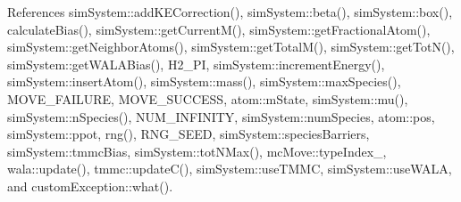 References sim\-System\-::add\-K\-E\-Correction(), sim\-System\-::beta(), sim\-System\-::box(), calculate\-Bias(), sim\-System\-::get\-Current\-M(), sim\-System\-::get\-Fractional\-Atom(), sim\-System\-::get\-Neighbor\-Atoms(), sim\-System\-::get\-Total\-M(), sim\-System\-::get\-Tot\-N(), sim\-System\-::get\-W\-A\-L\-A\-Bias(), H2\-\_\-P\-I, sim\-System\-::increment\-Energy(), sim\-System\-::insert\-Atom(), sim\-System\-::mass(), sim\-System\-::max\-Species(), M\-O\-V\-E\-\_\-\-F\-A\-I\-L\-U\-R\-E, M\-O\-V\-E\-\_\-\-S\-U\-C\-C\-E\-S\-S, atom\-::m\-State, sim\-System\-::mu(), sim\-System\-::n\-Species(), N\-U\-M\-\_\-\-I\-N\-F\-I\-N\-I\-T\-Y, sim\-System\-::num\-Species, atom\-::pos, sim\-System\-::ppot, rng(), R\-N\-G\-\_\-\-S\-E\-E\-D, sim\-System\-::species\-Barriers, sim\-System\-::tmmc\-Bias, sim\-System\-::tot\-N\-Max(), mc\-Move\-::type\-Index\-\_\-, wala\-::update(), tmmc\-::update\-C(), sim\-System\-::use\-T\-M\-M\-C, sim\-System\-::use\-W\-A\-L\-A, and custom\-Exception\-::what().


